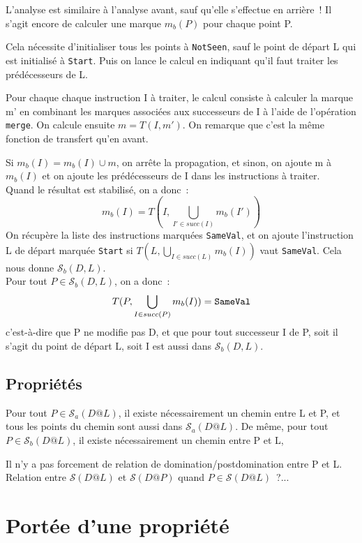 \documentclass[a4paper,twoside]{article}
\renewcommand{\sc}{\mathcal{S}}
\newcommand{\sca}{\mathcal{S}_a}
\newcommand{\scb}{\mathcal{S}_b}
\begin{document}
L'analyse est similaire à l'analyse avant, sauf qu'elle s'effectue en arrière~!
Il s'agit encore de calculer une marque $m_b(P)$ pour chaque point P.

Cela nécessite d'initialiser tous les points à {\tt NotSeen},
sauf le point de départ L qui est initialisé à  {\tt Start}.
Puis on lance le calcul en indiquant qu'il faut traiter 
les prédécesseurs de L.

Pour chaque chaque instruction I à traiter, le calcul consiste à
calculer la marque m' en combinant
les marques associées aux successeurs de I à l'aide de l'opération
{\tt merge}.
On calcule ensuite $m = T(I, m')$.
On remarque que c'est la même fonction de transfert qu'en avant.

Si $m_b(I) = m_b(I) \cup m$, on arrête la propagation,
et sinon, on ajoute m à $m_b(I)$
et on ajoute les prédécesseurs de I dans les  instructions à traiter.\\

Quand le résultat est stabilisé, on a donc~:
$$
m_b(I) = T(I, \bigcup_{I' \in succ(I)} m_b(I'))
$$
On récupère la liste des instructions
marquées {\tt SameVal}, 
et on ajoute l'instruction L de départ marquée {\tt Start} 
si $T(L, \bigcup_{I \in succ(L)} m_b(I))$ vaut {\tt SameVal}.
Cela nous donne $\scb(D,L)$.\\

Pour tout $P \in \scb(D,L)$, on a donc~:
$$
T(P, \bigcup_{I \in succ(P)} m_b(I)) = {\tt SameVal}
$$
c'est-à-dire que P ne modifie pas D, et que pour tout successeur I de P,
soit il s'agit du point de départ L, soit I est aussi dans $\scb(D,L)$.

\subsection{Propriétés}



Pour tout $P \in \sca(D@L)$, il existe nécessairement un chemin entre L et P,
et tous les points du chemin sont aussi dans $ \sca(D@L)$.
De même, pour tout $P \in \scb(D@L)$,  
il existe nécessairement un chemin entre P et L,

Il n'y a pas forcement de relation de domination/postdomination entre P et L.\\

Relation entre $\sc(D@L)$ et $\sc(D@P)$ quand $P \in \sc(D@L)$~?...

\section{Portée d'une propriété}\label{prop-scope}
\end{document}
